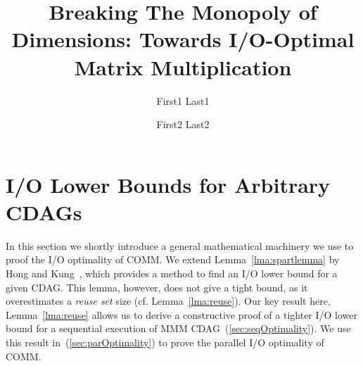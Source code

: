 \usepackage{booktabs} 
\usepackage{makecell}
\hypersetup{draft}

\usepackage{pifont}




\title[I/O-Optimal Dimensionless Matrix Multiplication]{\vspace{-1em}Breaking 
The 
Monopoly of Dimensions: Towards I/O-Optimal Matrix Multiplication}


\author{First1 Last1}

\author{First2 Last2}



\appendix


\section{I/O Lower Bounds for Arbitrary CDAGs}
\label{sec:introIO}
In this section we shortly introduce a general mathematical machinery we use 
to 
proof 
the I/O optimality of COMM. We extend Lemma~\ref{lma:spartlemma} by 
Hong and 
Kung~\cite{redblue}, which provides a method to find an I/O lower bound for a 
given CDAG. This lemma, however, does not give a tight bound, as it 
overestimates a \emph{reuse set} size (cf. 
Lemma~\ref{lma:reuse}). Our key result here, Lemma~\ref{lma:reuse} 
allows us to derive a constructive proof of a tighter I/O lower bound for a 
sequential execution of MMM CDAG~(\cref{sec:seqOptimality}). We use this 
result 
in~(\cref{sec:parOptimality}) to prove the parallel I/O optimality of COMM.

